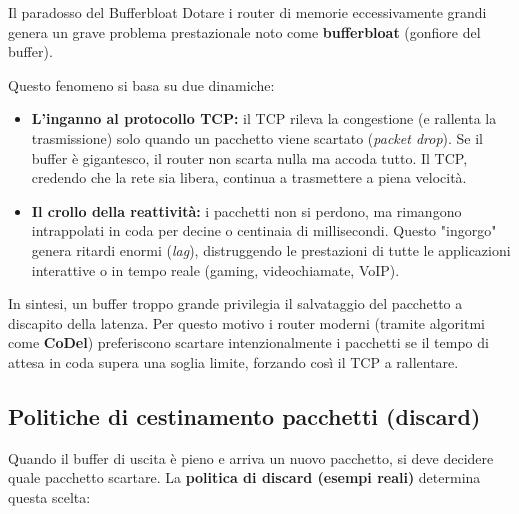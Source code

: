 \documentclass[a4paper,12pt]{report}
\begin{document}
\begin{notebox}{Il paradosso del Bufferbloat}
Dotare i router di memorie eccessivamente grandi genera un grave problema prestazionale noto come \textbf{bufferbloat} (gonfiore del buffer).

Questo fenomeno si basa su due dinamiche:
\begin{itemize}
    \item \textbf{L'inganno al protocollo TCP:} il TCP rileva la congestione (e rallenta la trasmissione) solo quando un pacchetto viene scartato (\emph{packet drop}). Se il buffer è gigantesco, il router non scarta nulla ma accoda tutto. Il TCP, credendo che la rete sia libera, continua a trasmettere a piena velocità.
    \item \textbf{Il crollo della reattività:} i pacchetti non si perdono, ma rimangono intrappolati in coda per decine o centinaia di millisecondi. Questo "ingorgo" genera ritardi enormi (\emph{lag}), distruggendo le prestazioni di tutte le applicazioni interattive o in tempo reale (gaming, videochiamate, VoIP).
\end{itemize}

In sintesi, un buffer troppo grande privilegia il salvataggio del pacchetto a discapito della latenza. Per questo motivo i router moderni (tramite algoritmi come \textbf{CoDel}) preferiscono scartare intenzionalmente i pacchetti se il tempo di attesa in coda supera una soglia limite, forzando così il TCP a rallentare.
\end{notebox}

\newpage

\subsection{Politiche di cestinamento pacchetti (discard)}
Quando il buffer di uscita è pieno e arriva un nuovo pacchetto, si deve
decidere quale pacchetto scartare. La \textbf{politica di discard (esempi reali)}
determina questa scelta:
\end{document}

